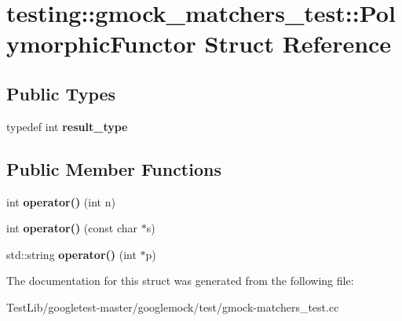 \hypertarget{structtesting_1_1gmock__matchers__test_1_1PolymorphicFunctor}{}\section{testing\+:\+:gmock\+\_\+matchers\+\_\+test\+:\+:Polymorphic\+Functor Struct Reference}
\label{structtesting_1_1gmock__matchers__test_1_1PolymorphicFunctor}
\subsection*{Public Types}
\begin{DoxyCompactItemize}
\item 
\mbox{\label{structtesting_1_1gmock__matchers__test_1_1PolymorphicFunctor_ae2b921ecae158b5eaa11a29ac6fe0cf3}} 
typedef int {\bfseries result\+\_\+type}
\end{DoxyCompactItemize}
\subsection*{Public Member Functions}
\begin{DoxyCompactItemize}
\item 
\mbox{\label{structtesting_1_1gmock__matchers__test_1_1PolymorphicFunctor_a2fb8b012acd2ccd52788231036877c98}} 
int {\bfseries operator()} (int n)
\item 
\mbox{\label{structtesting_1_1gmock__matchers__test_1_1PolymorphicFunctor_aee4d200c7f85ce4d8048d1798a511002}} 
int {\bfseries operator()} (const char $\ast$s)
\item 
\mbox{\label{structtesting_1_1gmock__matchers__test_1_1PolymorphicFunctor_afadd033a9ae644f159fff6c14a247a70}} 
std\+::string {\bfseries operator()} (int $\ast$p)
\end{DoxyCompactItemize}


The documentation for this struct was generated from the following file\+:\begin{DoxyCompactItemize}
\item 
Test\+Lib/googletest-\/master/googlemock/test/gmock-\/matchers\+\_\+test.\+cc\end{DoxyCompactItemize}
